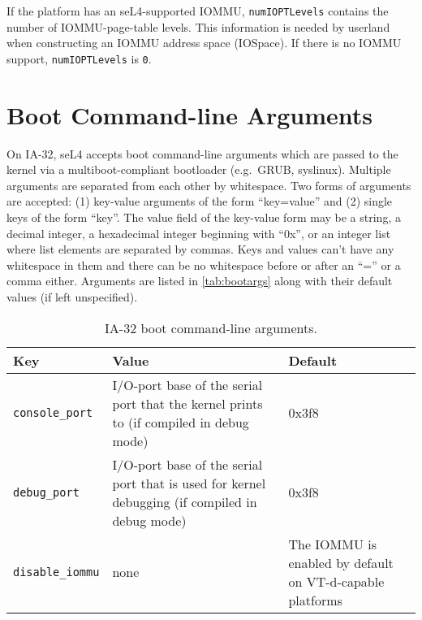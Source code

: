 If the platform has an seL4-supported IOMMU, \texttt{numIOPTLevels} contains
the number of IOMMU-page-table levels. This information is needed by userland
when constructing an IOMMU address space (IOSpace). If there is no IOMMU
support, \texttt{numIOPTLevels} is \texttt{0}.

\ifxeightsix
\section{Boot Command-line Arguments}

On IA-32, seL4 accepts boot command-line arguments which are passed to the
kernel via a multiboot-compliant bootloader (e.g.\ GRUB, syslinux). Multiple
arguments are separated from each other by whitespace. Two forms of arguments
are accepted:
(1) key-value arguments of the form ``key=value'' and (2) single keys of the
form ``key''. The value field of the key-value form may be a string, a decimal
integer, a hexadecimal integer beginning with ``0x'', or an integer list where
list elements are separated by commas.
Keys and values can't have any whitespace in them and there can be no
whitespace before or after an ``='' or a comma either.
Arguments are listed in \autoref{tab:bootargs} along with their default values (if left unspecified).


\begin{table}[htb]
    \caption{IA-32 boot command-line arguments.}
        \begin{tabularx}{\textwidth}{lXX}
            \toprule
              Key & Value & Default \\
            \midrule
            \texttt{console\_port} &
            I/O-port base of the serial port that the kernel prints to
            (if compiled in debug mode) &
            0x3f8 \\
            \texttt{debug\_port} &
            I/O-port base of the serial port that is used for kernel debugging
            (if compiled in debug mode) &
            0x3f8 \\
            \texttt{disable\_iommu} &
            none &
            The IOMMU is enabled by default on VT-d-capable platforms \\
            \bottomrule
        \end{tabularx}
    \label{tab:bootargs}
\end{table}
\fi
